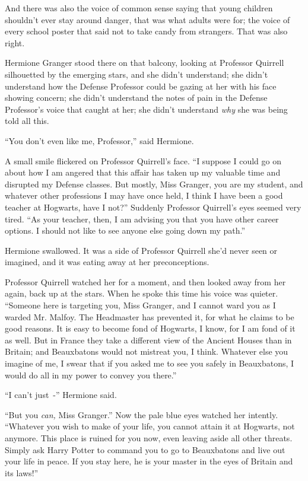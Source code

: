 And there was also the voice of common sense saying that young children shouldn't ever stay around danger, that was what adults were for; the voice of every school poster that said not to take candy from strangers. That was also right.

Hermione Granger stood there on that balcony, looking at Professor Quirrell silhouetted by the emerging stars, and she didn't understand; she didn't understand how the Defense Professor could be gazing at her with his face showing concern; she didn't understand the notes of pain in the Defense Professor's voice that caught at her; she didn't understand \emph{why} she was being told all this.

``You don't even like me, Professor,'' said Hermione.

A small smile flickered on Professor Quirrell's face. ``I suppose I could go on about how I am angered that this affair has taken up my valuable time and disrupted my Defense classes. But mostly, Miss Granger, you are my student, and whatever other professions I may have once held, I think I have been a good teacher at Hogwarts, have I not?'' Suddenly Professor Quirrell's eyes seemed very tired. ``As your teacher, then, I am advising you that you have other career options. I should not like to see anyone else going down my path.''

Hermione swallowed. It was a side of Professor Quirrell she'd never seen or imagined, and it was eating away at her preconceptions.

Professor Quirrell watched her for a moment, and then looked away from her again, back up at the stars. When he spoke this time his voice was quieter. ``Someone here is targeting you, Miss Granger, and I cannot ward you as I warded Mr. Malfoy. The Headmaster has prevented it, for what he claims to be good reasons. It is easy to become fond of Hogwarts, I know, for I am fond of it as well. But in France they take a different view of the Ancient Houses than in Britain; and Beauxbatons would not mistreat you, I think. Whatever else you imagine of me, I swear that if you asked me to see you safely in Beauxbatons, I would do all in my power to convey you there.''

``I can't just~-'' Hermione said.

``But you \emph{can,} Miss Granger.'' Now the pale blue eyes watched her intently. ``Whatever you wish to make of your life, you cannot attain it at Hogwarts, not anymore. This place is ruined for you now, even leaving aside all other threats. Simply ask Harry Potter to command you to go to Beauxbatons and live out your life in peace. If you stay here, he is your master in the eyes of Britain and its laws!''

